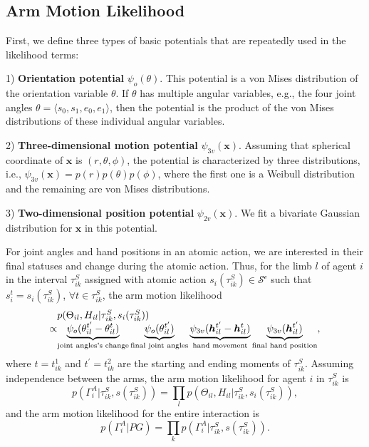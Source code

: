 \documentclass[letterpaper, 10 pt, conference]{ieeeconf}  %
\def \hb{\bm{h}} %
\def \xb{\bm{x}} %
\begin{document}
\subsection{Arm Motion Likelihood}

First, we define three types of basic potentials that are repeatedly used in the likelihood terms:

1) \textbf{Orientation potential} $\psi_o(\theta)$. This potential is a von Mises distribution of the orientation variable $\theta$. If $\theta$ has multiple angular variables, e.g., the four joint angles $\theta = \langle s_0, s_1, e_0, e_1\rangle$, then the potential is the product of the von Mises distributions of these individual angular variables.

2) \textbf{Three-dimensional motion potential} $\psi_{3v}(\xb)$. Assuming that spherical coordinate of $\xb$ is $(r,\theta,\phi)$, the potential is characterized by three distributions, i.e., $\psi_{3v}(\xb) = p(r)p(\theta)p(\phi)$, where the first one is a Weibull distribution and the remaining are von Mises distributions.

3) \textbf{Two-dimensional position potential} $\psi_{2v}(\xb)$. We fit a bivariate Gaussian distribution for $\xb$ in this potential. %

For joint angles and hand positions in an atomic action, we are interested in their final statuses and change during the atomic action. Thus, for the limb $l$ of agent $i$ in the interval $\tau^S_{ik}$ assigned with atomic action $s_i(\tau_{ik}^S) \in \mathcal{S^c}$ such that $s_i^t = s_i(\tau_{ik}^S)$, $\forall t \in \tau^S_{ik}$, the arm motion likelihood
\begin{equation}
\setlength{\arraycolsep}{0pt}
\begin{array}{lcl}
&&p(\Theta_{il}, H_{il} |  \tau^S_{ik}, s_i(\tau_{ik}^S))\\ &\propto&\underbrace{\psi_o(\theta_{il}^{t^\prime} - \theta_{il}^t)}_{\text{joint angles's change}} \underbrace{\psi_o( \theta_{il}^{t^\prime})}_{\text{final joint angles}} \underbrace{\psi_{3v}(\hb_{il}^{t^\prime} - \hb_{il}^{t})}_{\text{hand movement}} \underbrace{\psi_{3v}( \hb_{il}^{t^\prime})}_{\text{final hand position}},
\end{array}
\label{eq:motion_ll_limb}
\end{equation}
where $t = t_{ik}^1$ and $t^\prime = t_{ik}^2$ are the starting and ending moments of $\tau^S_{ik}$. Assuming independence between the arms, the arm motion likelihood for agent $i$ in $\tau_{ik}^S$ is
\begin{equation}
p(\Gamma_i^A| \tau^S_{ik}, s(\tau_{ik}^S) ) = \prod_l p(\Theta_{il}, H_{il} |  \tau^S_{ik}, s_i(\tau_{ik}^S)),
\label{eq:motion_ll_interval}
\end{equation}
and the arm motion likelihood for the entire interaction is
\begin{equation}
p(\Gamma_i^A| PG) = \prod_k p(\Gamma_i^A| \tau^S_{ik}, s(\tau_{ik}^S) ).
\label{eq:motion_ll_agent}
\end{equation}
\end{document}
